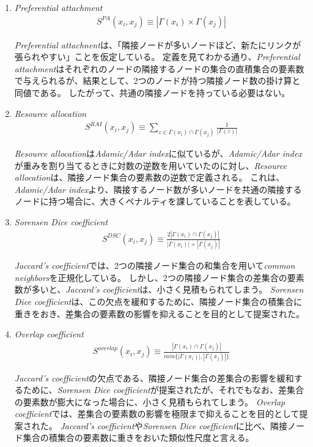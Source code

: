 \documentclass[titlepage,12pt]{jreport}
\begin{document}
\begin{enumerate}
\item {\it Preferential attachment}
\begin{eqnarray}
	S^{PA}(x_{i}, x_{j}) \equiv |\Gamma(x_{i}) \times \Gamma(x_{j})|
\end{eqnarray}

{\it Preferential attachnent}は、「隣接ノードが多いノードほど、新たにリンクが張られやすい」ことを仮定している\cite{pa02}。 定義を見てわかる通り、{\it Preferential attachment}はそれぞれのノードの隣接するノードの集合の直積集合の要素数で与えられるが、結果として、2つのノードが持つ隣接ノード数の掛け算と同値である。 したがって、共通の隣接ノードを持っている必要はない。

\item {\it Resource allocation}
\begin{eqnarray}
	S^{RAI}(x_{i}, x_{j}) \equiv \sum_{z \in \Gamma(x_{i}) \cap \Gamma(x_{j})} \frac{1}{|\Gamma(z)|}
\end{eqnarray}

{\it Resource allocation}は{\it Adamic/Adar index}に似ているが、{\it Adamic/Adar index}が重みを割り当てるときに対数の逆数を用いていたのに対し、{\it Resource allocation}は、隣接ノード集合の要素数の逆数で定義される。 これは、{\it Adamic/Adar index}より、隣接するノード数が多いノードを共通の隣接するノードに持つ場合に、大きくペナルティを課していることを表している。

\item {\it Sorensen Dice coefficient}
\begin{eqnarray}
	S^{DSC}(x_{i}, x_{j}) \equiv \frac{2|\Gamma(x_{i}) \cap \Gamma(x_{j})|}{|\Gamma(x_{i})| + |\Gamma(x_{j})|}
\end{eqnarray}

{\it Jaccard's coefficient}では、2つの隣接ノード集合の和集合を用いて{\it common neighbors}を正規化している。 しかし、2つの隣接ノード集合の差集合の要素数が多いと、{\it Jaccard's coefficient}は、小さく見積もられてしまう。 {\it Sorensen Dice coefficient}は、この欠点を緩和するために、隣接ノード集合の積集合に重きをおき、差集合の要素数の影響を抑えることを目的として提案された。 

\item {\it Overlap coefficient}
\begin{eqnarray}
	S^{overlap}(x_{i}, x_{j}) \equiv \frac{|\Gamma(x_{i}) \cap \Gamma(x_{j})|}{min \{ |\Gamma(x_{i})| , |\Gamma(x_{j})| \} }
\end{eqnarray}

{\it Jaccard's coefficient}の欠点である、隣接ノード集合の差集合の影響を緩和するために、{\it Sorensen Dice coefficient}が提案されたが、それでもなお、差集合の要素数が膨大になった場合に、小さく見積もられてしまう。 {\it Overlap coefficient}では、差集合の要素数の影響を極限まで抑えることを目的として提案された。 {\it Jaccard's coefficient}や{\it Sorensen Dice coefficient}に比べ、隣接ノード集合の積集合の要素数に重きをおいた類似性尺度と言える。
\end{enumerate}
\end{document}
